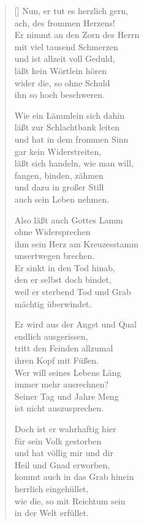 \begin{multicols}{2}
\begin{verse}[\versewidth]
 Nun, er tut es herzlich gern,\\
ach, des frommen Herzens!\\
Er nimmt an den Zorn des Herrn\\
mit viel tausend Schmerzen\\
und ist allzeit voll Geduld,\\
läßt kein Wörtlein hören\\
wider die, so ohne Schuld\\
ihn so hoch beschweren.

 Wie ein Lämmlein sich dahin\\
läßt zur Schlachtbank leiten\\
und hat in dem frommen Sinn\\
gar kein Widerstreiten,\\
läßt sich handeln, wie man will,\\
fangen, binden, zähmen\\
und dazu in großer Still\\
auch sein Leben nehmen.

 Also läßt auch Gottes Lamm\\
ohne Widersprechen\\
ihm sein Herz am Kreuzesstamm\\
unsertwegen brechen.\\
Er sinkt in den Tod hinab,\\
den er selbst doch bindet,\\
weil er sterbend Tod und Grab\\
mächtig überwindet.

 Er wird aus der Angst und Qual\\
endlich ausgerissen,\\
tritt den Feinden allzumal\\
ihren Kopf mit Füßen.\\
Wer will seines Lebens Läng\\
immer mehr ausrechnen?\\
Seiner Tag und Jahre Meng\\
ist nicht auszusprechen.

 Doch ist er wahrhaftig hier\\
für sein Volk gestorben\\
und hat völlig mir und dir\\
Heil und Gnad erworben,\\
kommt auch in das Grab hinein\\
herrlich eingehüllet,\\
wie die, so mit Reichtum sein\\
in der Welt erfüllet.


\end{verse}
\end{multicols}
